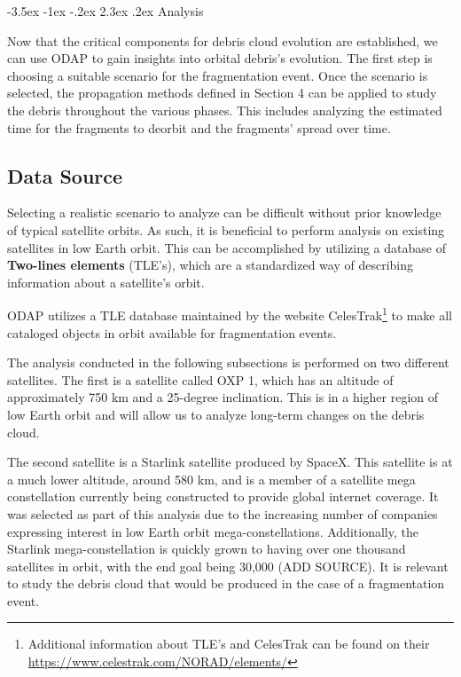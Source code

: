 \documentclass[a4paper, 12pt]{article}
\makeatletter
\renewcommand\section{\clearpage\newpage\@startsection {section}{1}{\z@}%
	{-3.5ex \@plus -1ex \@minus -.2ex}%
	{2.3ex \@plus.2ex}%
	{\normalfont\Large\bfseries}}
\newcommand{\lindex}[1]{%
	\lowercase{\def\temp{#1}}%
	\expandafter\index\expandafter{\temp}%
}
\newcommand{\boldindex}[1]{%
	\textbf{#1}\lindex{#1}%
}
\makeatother
\begin{document}
\section{Analysis}

Now that the critical components for debris cloud evolution are established, we can use ODAP to gain insights into orbital debris's evolution. The first step is choosing a suitable scenario for the fragmentation event. Once the scenario is selected, the propagation methods defined in Section 4 can be applied to study the debris throughout the various phases. This includes analyzing the estimated time for the fragments to deorbit and the fragments' spread over time.

\subsection{Data Source}
Selecting a realistic scenario to analyze can be difficult without prior knowledge of typical satellite orbits. As such, it is beneficial to perform analysis on existing satellites in low Earth orbit. This can be accomplished by utilizing a database of \boldindex{Two-lines elements} (TLE's), which are a standardized way of describing information about a satellite's orbit.

ODAP utilizes a TLE database maintained by the website CelesTrak\footnote{Additional information about TLE's and CelesTrak can be found on their \href{URL}{https://www.celestrak.com/NORAD/elements/}} to make all cataloged objects in orbit available for fragmentation events.

The analysis conducted in the following subsections is performed on two different satellites. The first is a satellite called OXP 1, which has an altitude of approximately 750 km and a 25-degree inclination. This is in a higher region of low Earth orbit and will allow us to analyze long-term changes on the debris cloud.

The second satellite is a Starlink satellite produced by SpaceX. This satellite is at a much lower altitude, around 580 km, and is a member of a satellite mega constellation currently being constructed to provide global internet coverage. It was selected as part of this analysis due to the increasing number of companies expressing interest in low Earth orbit mega-constellations. Additionally, the Starlink mega-constellation is quickly grown to having over one thousand satellites in orbit, with the end goal being 30,000 (ADD SOURCE). It is relevant to study the debris cloud that would be produced in the case of a fragmentation event.
\end{document}
